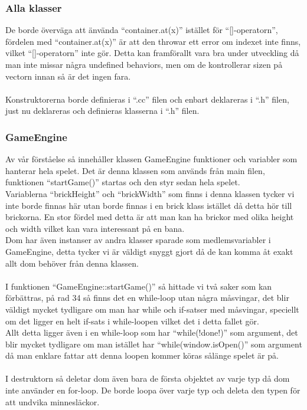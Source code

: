 \documentclass{TDP003mall}
\begin{document}
\subsubsection{Alla klasser}
De borde överväga att änvända ``container.at(x)'' istället för ``[]-operatorn'', fördelen med ``container.at(x)'' är att den throwar ett error om indexet inte finns, vilket ``[]-operatorn'' inte gör. Detta kan framförallt vara bra under utveckling då man inte missar några undefined behaviors, men om de kontrollerar sizen på vectorn innan så är det ingen fara.
\\\\
Konstruktorerna borde definieras i ``.cc'' filen och enbart deklareras i ``.h'' filen, just nu deklareras och definieras klasserna i ``.h'' filen.

\subsubsection{GameEngine}
Av vår förståelse så innehåller klassen GameEngine funktioner och variabler som hanterar hela spelet. Det är denna klassen som används från main filen, funktionen ``startGame()'' startas och den styr sedan hela spelet. \\
Variablerna ``brickHeight'' och ``brickWidth'' som finns i denna klassen tycker vi inte borde finnas här utan borde finnas i en brick klass istället då detta hör till brickorna. En stor fördel med detta är att man kan ha brickor med olika height och width vilket kan vara interessant på en bana. \\
Dom har även instanser av andra klasser sparade som medlemsvariabler i GameEngine, detta tycker vi är väldigt snyggt gjort då de kan komma åt exakt allt dom behöver från denna klassen.
\\\\
I funktionen ``GameEngine::startGame()'' så hittade vi två saker som kan förbättras, på rad 34 så finns det en while-loop utan några måsvingar, det blir väldigt mycket tydligare om man har while och if-satser med måsvingar, speciellt om det ligger en helt if-sats i while-loopen vilket det i detta fallet gör. \\

Allt detta ligger även i en while-loop som har ``while(!done!)'' som argument, det blir mycket tydligare om man istället har ``while(window.isOpen()'' som argument då man enklare fattar att denna loopen kommer köras sålänge spelet är på.
\\\\
I destruktorn så deletar dom även bara de första objektet av varje typ då dom inte använder en for-loop. De borde loopa över varje typ och deleta den typen för att undvika minnesläckor.
\end{document}
